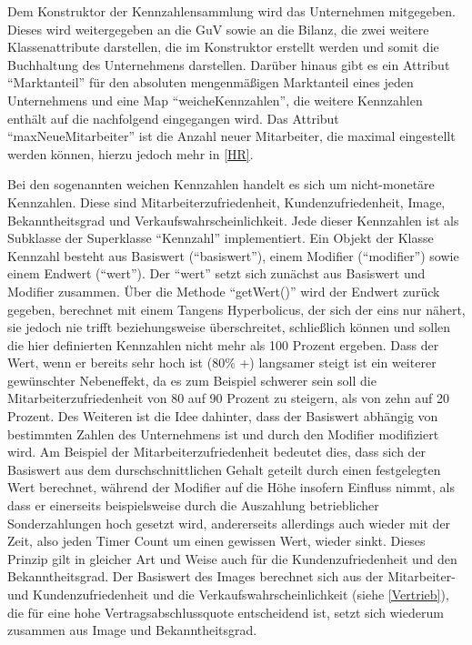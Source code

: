 Dem Konstruktor der Kennzahlensammlung wird das Unternehmen mitgegeben. Dieses wird weitergegeben an die GuV sowie an die Bilanz, die zwei weitere Klassenattribute darstellen, die im Konstruktor erstellt werden und somit die Buchhaltung des Unternehmens darstellen. Darüber hinaus gibt es ein Attribut \enquote{Marktanteil} für den absoluten mengenmäßigen Marktanteil eines jeden Unternehmens und eine Map \enquote{weicheKennzahlen}, die weitere Kennzahlen enthält auf die nachfolgend eingegangen wird. Das Attribut \enquote{maxNeueMitarbeiter} ist die Anzahl neuer Mitarbeiter, die maximal eingestellt werden können, hierzu jedoch mehr in \ref{HR}.

Bei den sogenannten weichen Kennzahlen handelt es sich um nicht-monetäre Kennzahlen. Diese sind Mitarbeiterzufriedenheit, Kundenzufriedenheit, Image, Bekanntheitsgrad und Verkaufswahrscheinlichkeit. Jede dieser Kennzahlen ist als Subklasse der Superklasse \enquote{Kennzahl} implementiert. Ein Objekt der Klasse Kennzahl besteht aus Basiswert (\enquote{basiswert}), einem Modifier (\enquote{modifier}) sowie einem Endwert (\enquote{wert}). Der \enquote{wert} setzt sich zunächst aus Basiswert und Modifier zusammen. Über die Methode \enquote{getWert()} wird der Endwert zurück gegeben, berechnet mit einem Tangens Hyperbolicus, der sich der eins nur nähert, sie jedoch nie trifft beziehungsweise überschreitet, schließlich können und sollen die hier definierten Kennzahlen nicht mehr als 100 Prozent ergeben. Dass der Wert, wenn er bereits sehr hoch ist (80\% +) langsamer steigt ist ein weiterer gewünschter Nebeneffekt, da es zum Beispiel schwerer sein soll die Mitarbeiterzufriedenheit von 80 auf 90 Prozent zu steigern, als von zehn auf 20 Prozent. Des Weiteren ist die Idee dahinter, dass der Basiswert abhängig von bestimmten Zahlen des Unternehmens ist und durch den Modifier modifiziert wird. Am Beispiel der Mitarbeiterzufriedenheit bedeutet dies, dass sich der Basiswert aus dem durschschnittlichen Gehalt geteilt durch einen festgelegten Wert berechnet, während der Modifier auf die Höhe insofern Einfluss nimmt, als dass er einerseits beispielsweise durch die Auszahlung betrieblicher Sonderzahlungen hoch gesetzt wird, andererseits allerdings auch wieder mit der Zeit, also jeden Timer Count um einen gewissen Wert, wieder sinkt. Dieses Prinzip gilt in gleicher Art und Weise auch für die Kundenzufriedenheit und den Bekanntheitsgrad. Der Basiswert des Images berechnet sich aus der Mitarbeiter- und Kundenzufriedenheit und die Verkaufswahrscheinlichkeit (siehe \ref{Vertrieb}), die für eine hohe Vertragsabschlussquote entscheidend ist, setzt sich wiederum zusammen aus Image und Bekanntheitsgrad.

